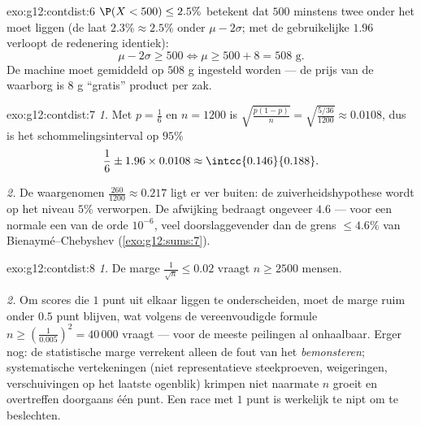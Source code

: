 \begin{solution}{exo:g12:contdist:6}
$\P(X < 500) \leq 2.5\%$ betekent dat $500$ minstens twee
 onder het  moet liggen (de 
laat $2.3\% \approx 2.5\%$ onder $\mu - 2\sigma$; met de gebruikelijke $1.96$
verloopt de redenering identiek):
\[
\mu - 2\sigma \geq 500 \iff \mu \geq 500 + 8 = 508 \text{ g}.
\]
De machine moet gemiddeld op $508$ g ingesteld worden --- de prijs van de
waarborg is $8$ g ``gratis'' product per zak.
\end{solution}

\begin{solution}{exo:g12:contdist:7}
\emph{1.} Met $p = \frac16$ en $n = 1200$ is
$\sqrt{\frac{p(1-p)}{n}} = \sqrt{\frac{5/36}{1200}} \approx 0.0108$, dus is
het schommelingsinterval op $95\%$
\[
\frac16 \pm 1.96 \times 0.0108 \approx \intcc{0.146}{0.188}.
\]

\emph{2.} De waargenomen  $\frac{260}{1200} \approx 0.217$ ligt er
ver buiten: de zuiverheidshypothese wordt op het niveau $5\%$ verworpen. De
afwijking bedraagt ongeveer $4.6$  --- voor een normale
 een  van de orde $10^{-6}$, veel doorslaggevender dan de grens
$\leq 4.6\%$ van Bienaymé--Chebyshev (\cref{exo:g12:sums:7}).
\end{solution}

\begin{solution}{exo:g12:contdist:8}
\emph{1.} De marge $\frac{1}{\sqrt n} \leq 0.02$ vraagt $n \geq 2500$ mensen.

\emph{2.} Om scores die $1$ punt uit elkaar liggen te onderscheiden, moet de
marge ruim onder $0.5$ punt blijven, wat volgens de vereenvoudigde formule
$n \geq \left(\frac{1}{0.005}\right)^2 = 40\,000$ vraagt --- voor de meeste
peilingen al onhaalbaar. Erger nog: de statistische marge verrekent alleen de
fout van het \emph{bemonsteren}; systematische vertekeningen (niet
representatieve steekproeven, weigeringen, verschuivingen op het laatste
ogenblik) krimpen niet naarmate $n$ groeit en overtreffen doorgaans één punt.
Een race met $1$ punt  is werkelijk te nipt om te beslechten.
\end{solution}

